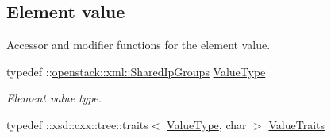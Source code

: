 \subsection*{Element value}
\label{_amgrp2ee2eae1a8c390ea033f241c027da8d6}
Accessor and modifier functions for the element value. \begin{DoxyCompactItemize}
\item 
\hypertarget{classopenstack_1_1xml_1_1SharedIpGroups___ae523a614cd782d302b4ffc0be0eef8bd}{
typedef ::\hyperlink{classopenstack_1_1xml_1_1SharedIpGroups}{openstack::xml::SharedIpGroups} \hyperlink{classopenstack_1_1xml_1_1SharedIpGroups___ae523a614cd782d302b4ffc0be0eef8bd}{ValueType}}
\label{classopenstack_1_1xml_1_1SharedIpGroups___ae523a614cd782d302b4ffc0be0eef8bd}

\begin{DoxyCompactList}\small\item\em Element value type. \item\end{DoxyCompactList}\item 
\hypertarget{classopenstack_1_1xml_1_1SharedIpGroups___a6828440b0932ecaf0b06f4afe4ababfb}{
typedef ::xsd::cxx::tree::traits$<$ \hyperlink{classopenstack_1_1xml_1_1SharedIpGroups}{ValueType}, char $>$ \hyperlink{classopenstack_1_1xml_1_1SharedIpGroups___a6828440b0932ecaf0b06f4afe4ababfb}{ValueTraits}}
\label{classopenstack_1_1xml_1_1SharedIpGroups___a6828440b0932ecaf0b06f4afe4ababfb}


\end{DoxyCompactItemize}
